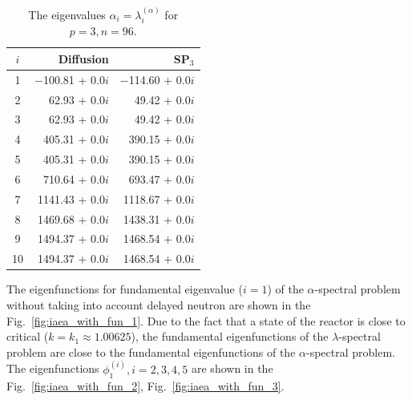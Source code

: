 \documentclass[authoryear]{elsarticle}
\begin{document}
\begin{table}[h]
\caption{The eigenvalues $\alpha_i=\lambda_i^{(\alpha)}$ for $p=3, n=96$.}
\label{tab:iaea_with_alpha_10}
\begin{center}
\begin{tabular}{c r r}
\hline
$i$ & Diffusion & SP$_3$ \\
\hline
1 &$-$100.81 + 0.0$i$&$-$114.60 + 0.0$i$ \\
2 &  62.93 + 0.0$i$& 49.42 + 0.0$i$ \\
3 &  62.93 + 0.0$i$& 49.42 + 0.0$i$ \\
4 & 405.31 + 0.0$i$&390.15 + 0.0$i$ \\
5 & 405.31 + 0.0$i$&390.15 + 0.0$i$ \\
6 & 710.64 + 0.0$i$&693.47 + 0.0$i$ \\
7 &1141.43 + 0.0$i$&1118.67 + 0.0$i$ \\
8 &1469.68 + 0.0$i$&1438.31 + 0.0$i$ \\
9 &1494.37 + 0.0$i$&1468.54 + 0.0$i$ \\
10&1494.37 + 0.0$i$&1468.54 + 0.0$i$ \\
\hline
\end{tabular}
\end{center}
\end{table}

The eigenfunctions for fundamental eigenvalue ($i=1$) of the $\alpha$-spectral problem without taking into account delayed neutron are shown in the Fig.~\ref{fig:iaea_with_fun_1}. 
Due to the fact that a state of the reactor is close to critical ($k=k_1\approx 1.00625$), the fundamental eigenfunctions of the $\lambda$-spectral problem are close to the fundamental eigenfunctions of the $\alpha$-spectral problem.
The eigenfunctions $\phi_1^{(i)}, i=2,3,4,5$ are shown in the Fig.~\ref{fig:iaea_with_fun_2}, Fig.~\ref{fig:iaea_with_fun_3}.
\end{document}

